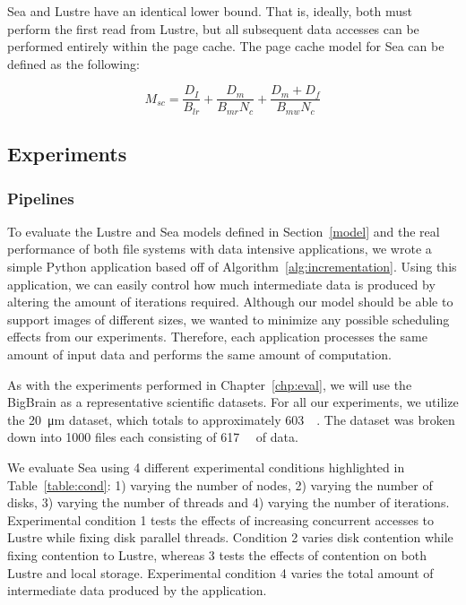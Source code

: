       Sea and Lustre have an identical lower bound. That is, ideally, both must
      perform the first read from Lustre, but all subsequent data accesses can
      be performed entirely within the page cache. The page cache model for Sea
      can be defined as the following:

      \begin{equation}\label{eq:msc}
          M_{sc} = \frac{D_{I}}{B_{lr}} + \frac{D_{m}}{B_{mr}N_{c}} + \frac{D_{m} + D_{f}}{B_{mw}N_{c}}
      \end{equation}
\subsection{Experiments}
\subsubsection{Pipelines}
      To evaluate the Lustre and Sea models defined in Section~\ref{model} and the real
      performance of both file systems with data intensive applications, we wrote a simple
      Python application based off of Algorithm~\ref{alg:incrementation}.          
      Using this application, we can easily control how much intermediate data is produced
      by altering the amount of iterations required. Although our model should be able
      to support images of different sizes, we wanted to minimize any possible     
      scheduling effects from our experiments. Therefore, each application         
      processes the same amount of input data and performs the same amount of computation.
                                                                                   
      As with the experiments performed in Chapter~\ref{chp:eval}, we will use the BigBrain
      as a representative scientific datasets. For all our experiments, we utilize the
      \SI{20}{\micro\meter} dataset, which totals to approximately \SI{603}{\gibi\byte}.
      The dataset was broken down into 1000 files each consisting of \SI{617}{\mebi\byte}
      of data.                                                                     
                                                                                   
      We evaluate Sea using 4 different experimental conditions highlighted in Table~\ref{table:cond}:
      1) varying the number of nodes, 2) varying the number of disks, 3) varying the number of threads and 4)
      varying the number of iterations. Experimental condition 1 tests the effects 
      of increasing concurrent accesses to Lustre while fixing disk parallel threads. Condition 2
      varies disk contention while fixing contention to Lustre, whereas 3 tests the effects
      of contention on both Lustre and local storage. Experimental condition       
      4 varies the total amount of intermediate data produced by the application.
